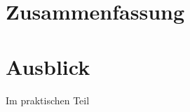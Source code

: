 \chapter{Zusammenfassung}
\label{ch:zusammenfassung}

%
%
%

%

%



\chapter{Ausblick}
\label{ch:ausblick}
Im praktischen Teil
